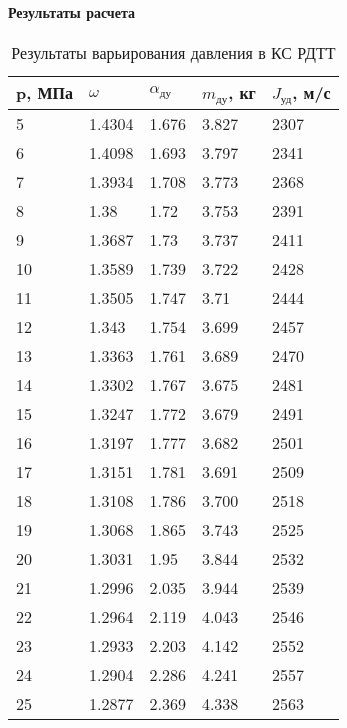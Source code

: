 \paragraph{Результаты расчета}
\begin{table}[!h]
	\begin{center}
		\caption{Результаты варьирования давления в КС РДТТ}
		\begin{tabular}{|l|l|l|l|l|}
  		\hline
\textbf{p, МПа} & \textbf{$\omega$ }& \textbf{$\alpha_\text{ду}$} & \textbf{$m_\text{ду}$, кг} & \textbf{$J_\text{уд}$, м/с}\\ \hline 
5 & 1.4304 & 1.676 & 3.827 & 2307\\ \hline 
6 & 1.4098 & 1.693 & 3.797 & 2341\\ \hline 
7 & 1.3934 & 1.708 & 3.773 & 2368\\ \hline 
8 & 1.38 & 1.72 & 3.753 & 2391\\ \hline 
9 & 1.3687 & 1.73 & 3.737 & 2411\\ \hline 
10 & 1.3589 & 1.739 & 3.722 & 2428\\ \hline 
11 & 1.3505 & 1.747 & 3.71 & 2444\\ \hline 
12 & 1.343 & 1.754 & 3.699 & 2457\\ \hline 
13 & 1.3363 & 1.761 & 3.689 & 2470\\ \hline 
14 & 1.3302 & 1.767 & 3.675 & 2481\\ \hline 
15 & 1.3247 & 1.772 & 3.679 & 2491\\ \hline 
16 & 1.3197 & 1.777 & 3.682 & 2501\\ \hline 
17 & 1.3151 & 1.781 & 3.691 & 2509\\ \hline 
18 & 1.3108 & 1.786 & 3.700 & 2518\\ \hline 
19 & 1.3068 & 1.865 & 3.743 & 2525\\ \hline 
20 & 1.3031 & 1.95 & 3.844 & 2532\\ \hline 
21 & 1.2996 & 2.035 & 3.944 & 2539\\ \hline 
22 & 1.2964 & 2.119 & 4.043 & 2546\\ \hline 
23 & 1.2933 & 2.203 & 4.142 & 2552\\ \hline 
24 & 1.2904 & 2.286 & 4.241 & 2557\\ \hline 
25 & 1.2877 & 2.369 & 4.338 & 2563\\ \hline 
		\end{tabular}
		\label{tab:rdtt_result}
	\end{center}
\end{table}


